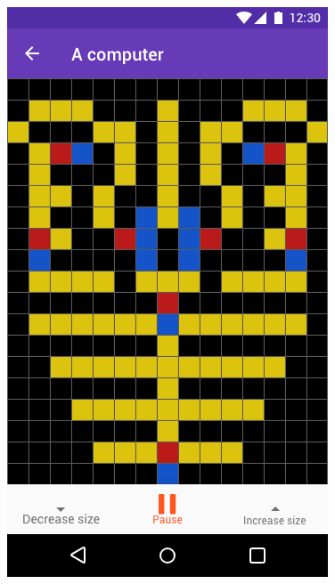 \documentclass{report}
\begin{document}
\begin{minipage}{.45\textwidth}
  \begin{minipage}{.45\linewidth}
    \includegraphics[width=\linewidth]{../mock-ups/Play_game_playing.png}
  \end{minipage}\hfill
  \begin{minipage}{.45\linewidth}
  \end{minipage}%
\end{minipage} \hfill
\end{document}
